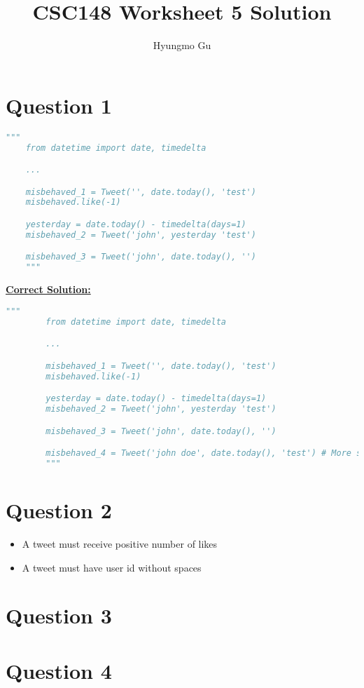 \documentclass[12pt]{article}
\begin{document}
\title{CSC148 Worksheet 5 Solution}
\author{Hyungmo Gu}
\maketitle

\section*{Question 1}

\begin{lstlisting}[language=Python]
    """
    from datetime import date, timedelta

    ...

    misbehaved_1 = Tweet('', date.today(), 'test')
    misbehaved.like(-1)

    yesterday = date.today() - timedelta(days=1)
    misbehaved_2 = Tweet('john', yesterday 'test')

    misbehaved_3 = Tweet('john', date.today(), '')
    """
\end{lstlisting}

\bigskip

\begin{mdframed}
    \underline{\textbf{Correct Solution:}}

    \bigskip

    \begin{lstlisting}[language=Python]
        """
        from datetime import date, timedelta

        ...

        misbehaved_1 = Tweet('', date.today(), 'test')
        misbehaved.like(-1)

        yesterday = date.today() - timedelta(days=1)
        misbehaved_2 = Tweet('john', yesterday 'test')

        misbehaved_3 = Tweet('john', date.today(), '')

        misbehaved_4 = Tweet('john doe', date.today(), 'test') # More solution!!
        """
    \end{lstlisting}

\end{mdframed}

\section*{Question 2}
\begin{itemize}
    \item A tweet must receive positive number of likes
    \item A tweet must have user id without spaces
\end{itemize}

\section*{Question 3}

\section*{Question 4}
\end{document}
